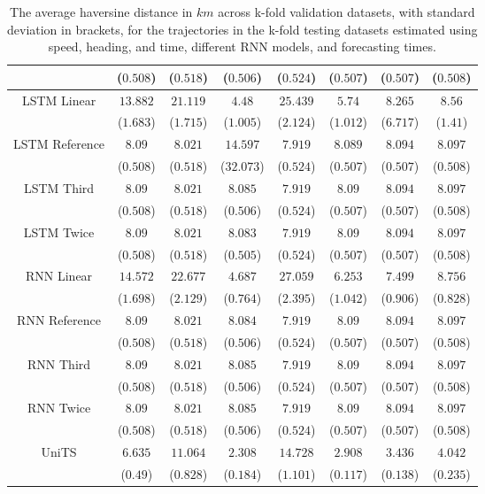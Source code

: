 \begin{table}[!ht]
{\begin{tabular}{|c|c|c|c|c|c|c|c|}
			 & ($0.508$) & ($0.518$) & ($0.506$) & ($0.524$) & ($0.507$) & ($0.507$) & ($0.508$) \\ \hline
			\multirow{2}{*}{LSTM Linear} & $13.882$ & $21.119$ & $4.48$ & $25.439$ & $5.74$ & $8.265$ & $8.56$ \\
			 & ($1.683$) & ($1.715$) & ($1.005$) & ($2.124$) & ($1.012$) & ($6.717$) & ($1.41$) \\ \hline
			\multirow{2}{*}{LSTM Reference} & $8.09$ & $8.021$ & $14.597$ & $7.919$ & $8.089$ & $8.094$ & $8.097$ \\
			 & ($0.508$) & ($0.518$) & ($32.073$) & ($0.524$) & ($0.507$) & ($0.507$) & ($0.508$) \\ \hline
			\multirow{2}{*}{LSTM Third} & $8.09$ & $8.021$ & $8.085$ & $7.919$ & $8.09$ & $8.094$ & $8.097$ \\
			 & ($0.508$) & ($0.518$) & ($0.506$) & ($0.524$) & ($0.507$) & ($0.507$) & ($0.508$) \\ \hline
			\multirow{2}{*}{LSTM Twice} & $8.09$ & $8.021$ & $8.083$ & $7.919$ & $8.09$ & $8.094$ & $8.097$ \\
			 & ($0.508$) & ($0.518$) & ($0.505$) & ($0.524$) & ($0.507$) & ($0.507$) & ($0.508$) \\ \hline
			\multirow{2}{*}{RNN Linear} & $14.572$ & $22.677$ & $4.687$ & $27.059$ & $6.253$ & $7.499$ & $8.756$ \\
			 & ($1.698$) & ($2.129$) & ($0.764$) & ($2.395$) & ($1.042$) & ($0.906$) & ($0.828$) \\ \hline
			\multirow{2}{*}{RNN Reference} & $8.09$ & $8.021$ & $8.084$ & $7.919$ & $8.09$ & $8.094$ & $8.097$ \\
			 & ($0.508$) & ($0.518$) & ($0.506$) & ($0.524$) & ($0.507$) & ($0.507$) & ($0.508$) \\ \hline
			\multirow{2}{*}{RNN Third} & $8.09$ & $8.021$ & $8.085$ & $7.919$ & $8.09$ & $8.094$ & $8.097$ \\
			 & ($0.508$) & ($0.518$) & ($0.506$) & ($0.524$) & ($0.507$) & ($0.507$) & ($0.508$) \\ \hline
			\multirow{2}{*}{RNN Twice} & $8.09$ & $8.021$ & $8.085$ & $7.919$ & $8.09$ & $8.094$ & $8.097$ \\
			 & ($0.508$) & ($0.518$) & ($0.506$) & ($0.524$) & ($0.507$) & ($0.507$) & ($0.508$) \\ \hline
			\multirow{2}{*}{UniTS} & $6.635$ & $11.064$ & $2.308$ & $14.728$ & $2.908$ & $3.436$ & $4.042$ \\
			 & ($0.49$) & ($0.828$) & ($0.184$) & ($1.101$) & ($0.117$) & ($0.138$) & ($0.235$) \\ \hline
		\end{tabular}
	}
	\caption{The average haversine distance in $km$ across k-fold validation datasets, with standard deviation in brackets, for the trajectories in the k-fold testing datasets estimated using speed, heading, and time, different RNN models, and forecasting times.}
	\label{tab:all_speed_actual_dir_haversine}
\end{table}